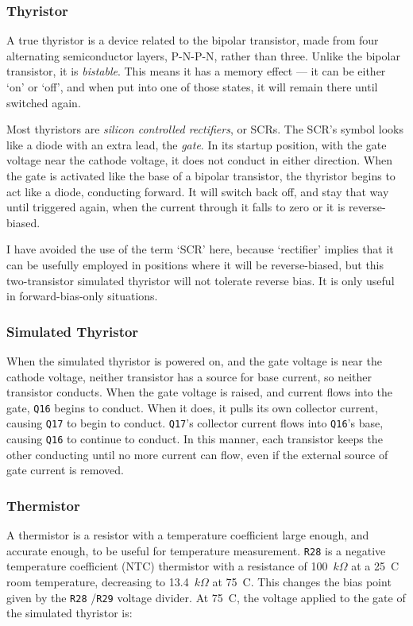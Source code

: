 \begin{multicols}{2}
\subsubsection{Thyristor}

A true thyristor is a device related to the bipolar transistor, made from
four alternating semiconductor layers, P-N-P-N, rather than three.
Unlike the bipolar transistor, it is \emph{bistable}. This means it has a
memory effect --- it can be either `on' or `off', and when put into one of
those states, it will remain there until switched again.

Most thyristors are \emph{silicon controlled rectifiers}, or SCRs.
The SCR's symbol looks like a diode with an extra lead, the \emph{gate}.
In its startup position, with the gate voltage near the cathode voltage, it
does not conduct in either direction. When the gate is activated like the base
of a bipolar transistor, the thyristor begins to act like a diode, conducting
forward. It will switch back off, and stay that way until triggered again, when
the current through it falls to zero or it is reverse-biased.

I have avoided the use of the term `SCR' here, because `rectifier' implies that
it can be usefully employed in positions where it will be reverse-biased, but
this two-transistor simulated thyristor will not tolerate reverse bias. It is
only useful in forward-bias-only situations.

\subsubsection{Simulated Thyristor}
When the simulated thyristor is powered on, and the gate voltage is near the
cathode voltage, neither transistor has a source for base current, so
neither transistor conducts. When the gate voltage is raised, and current flows
into the gate, \texttt{Q16} begins to conduct. When it does, it pulls its own
collector current, causing \texttt{Q17} to begin to conduct. \texttt{Q17}'s
collector current flows into \texttt{Q16}'s base, causing \texttt{Q16} to
continue to conduct. In this manner, each transistor keeps the other conducting
until no more current can flow, even if the external source of gate current is
removed.

\subsubsection{Thermistor}
A thermistor is a resistor with a temperature coefficient large enough, and
accurate enough, to be useful for temperature measurement. \texttt{R28} is
a negative temperature coefficient (NTC) thermistor with a resistance of
100~$k\Omega$ at a 25~\dg C room temperature, decreasing to 13.4~$k\Omega$
at 75~\dg C. This changes the bias point given by the \texttt{R28}%
/\texttt{R29} voltage divider. At 75~\dg C, the voltage applied to the
gate of the simulated thyristor is:


\end{multicols}
